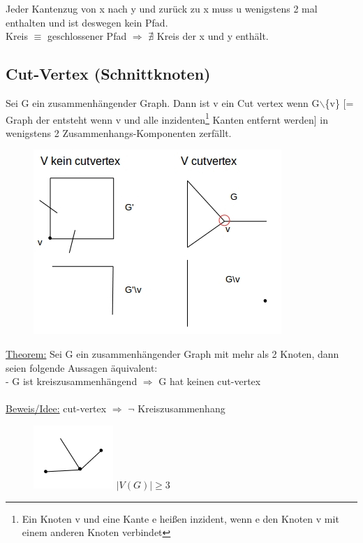Jeder Kantenzug von x nach y und zurück zu x muss u wenigstens 2 mal enthalten und ist deswegen kein Pfad.\\
Kreis $\equiv$ geschlossener Pfad $\Rightarrow$ $\nexists$ Kreis der x und y enthält.

\subsection{Cut-Vertex (Schnittknoten)}
Sei G ein zusammenhängender Graph. Dann ist v ein Cut vertex wenn G$\backslash$\{v\} [= Graph der entsteht wenn v und alle inzidenten\footnote{Ein Knoten v und eine Kante e heißen inzident, wenn e den Knoten v mit einem anderen Knoten verbindet} Kanten entfernt werden] in wenigstens 2 Zusammenhangs-Komponenten zerfällt.
\begin{figure}[htp]
\centering
\includegraphics[scale=1.00]{lectures/161021/pix/pic3.jpg}
\end{figure}

\underline{Theorem:} Sei G ein zusammenhängender Graph mit mehr als 2 Knoten, dann seien folgende Aussagen äquivalent:\\
 - G ist kreiszusammenhängend $\Rightarrow$ G hat keinen cut-vertex
\\\\
\underline{Beweis/Idee:}
cut-vertex $\Rightarrow$ $\neg$ Kreiszusammenhang
\begin{figure}[htp]
\centering
\includegraphics[scale=1.00]{lectures/161021/pix/pic4.jpg}
$|V(G)| \geq 3$
\end{figure}

